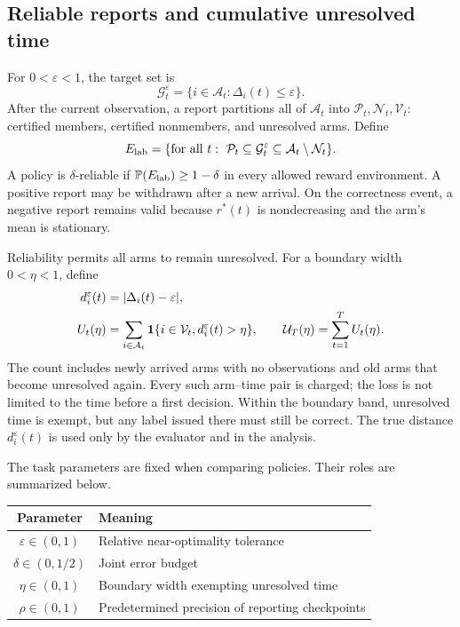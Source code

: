 \documentclass[11pt]{article}
\begin{document}
\subsection{Reliable reports and cumulative unresolved time}
\label{sec:reporting_task}

For $0<\varepsilon<1$, the target set is
\[
 \mathcal G_t^\varepsilon=\{i\in\mathcal A_t:\Delta_i(t)\le\varepsilon\}.
\]
After the current observation, a report partitions all of $\mathcal A_t$
into $\mathcal P_t,\mathcal N_t,\mathcal V_t$: certified members, certified
nonmembers, and unresolved arms. Define
\[
 E_{\rm lab}=\{\text{for all }t:\ \mathcal P_t\subseteq\mathcal G_t^\varepsilon
                  \subseteq\mathcal A_t\setminus\mathcal N_t\}.
\]
A policy is $\delta$-reliable if $\mathbb P(E_{\rm lab})\ge1-\delta$ in every
allowed reward environment. A positive report may be withdrawn after a new
arrival. On the correctness event, a negative report remains valid because
$r^*(t)$ is nondecreasing and the arm's mean is stationary.

Reliability permits all arms to remain unresolved. For a boundary width
$0<\eta<1$, define
\begin{equation}
 \begin{split}
 d_i^\varepsilon(t)&=|\Delta_i(t)-\varepsilon|,\\
 U_t(\eta)&=\sum_{i\in\mathcal A_t}
   \mathbf 1\{i\in\mathcal V_t,d_i^\varepsilon(t)>\eta\},\qquad
 \mathcal U_T(\eta)=\sum_{t=1}^{T}U_t(\eta).
 \end{split}
 \label{eq:area}
\end{equation}
The count includes newly arrived arms with no observations and old arms
that become unresolved again. Every such arm--time pair is charged; the
loss is not limited to the time before a first decision. Within the
boundary band, unresolved time is exempt, but any label issued there must
still be correct. The true distance $d_i^\varepsilon(t)$ is used only by
the evaluator and in the analysis.

The task parameters are fixed when comparing policies. Their roles are
summarized below.
\begin{center}
\begin{tabular}{cl}
\toprule
Parameter & Meaning\\
\midrule
$\varepsilon\in(0,1)$ & Relative near-optimality tolerance\\
$\delta\in(0,1/2)$ & Joint error budget\\
$\eta\in(0,1)$ & Boundary width exempting unresolved time\\
$\rho\in(0,1)$ & Predetermined precision of reporting checkpoints\\
\bottomrule
\end{tabular}
\end{center}
\end{document}
